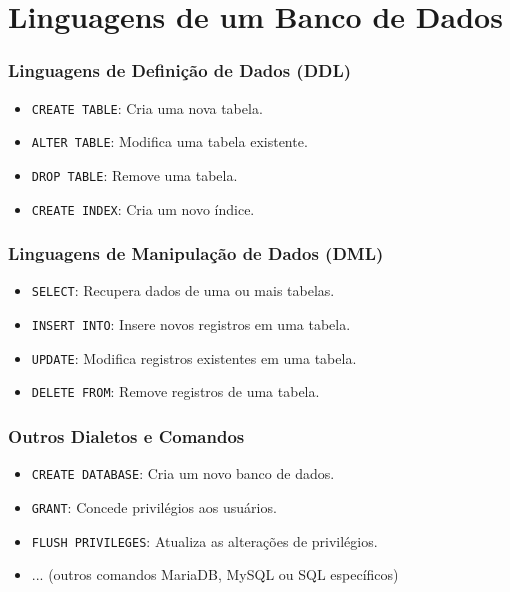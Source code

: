 \documentclass[13pt, xcolor={dvipsnames,svgnames}, portuguese]{beamer}
\begin{document}
\section{Linguagens de um Banco de Dados}

\begin{frame}
  \frametitle{Linguagens de Definição de Dados (DDL)}
  \begin{itemize}
    \item \texttt{CREATE TABLE}: Cria uma nova tabela.
    \item \texttt{ALTER TABLE}: Modifica uma tabela existente.
    \item \texttt{DROP TABLE}: Remove uma tabela.
    \item \texttt{CREATE INDEX}: Cria um novo índice.
  \end{itemize}
\end{frame}
\begin{frame}
  \frametitle{Linguagens de Manipulação de Dados (DML)}
  \begin{itemize}
    \item \texttt{SELECT}: Recupera dados de uma ou mais tabelas.
    \item \texttt{INSERT INTO}: Insere novos registros em uma tabela.
    \item \texttt{UPDATE}: Modifica registros existentes em uma tabela.
    \item \texttt{DELETE FROM}: Remove registros de uma tabela.
  \end{itemize}
\end{frame}
\begin{frame}
  \frametitle{Outros Dialetos e Comandos}
  \begin{itemize}
    \item \texttt{CREATE DATABASE}: Cria um novo banco de dados.
    \item \texttt{GRANT}: Concede privilégios aos usuários.
    \item \texttt{FLUSH PRIVILEGES}: Atualiza as alterações de privilégios.
    \item ... (outros comandos MariaDB, MySQL ou SQL específicos)
  \end{itemize}
\end{frame}
\end{document}
